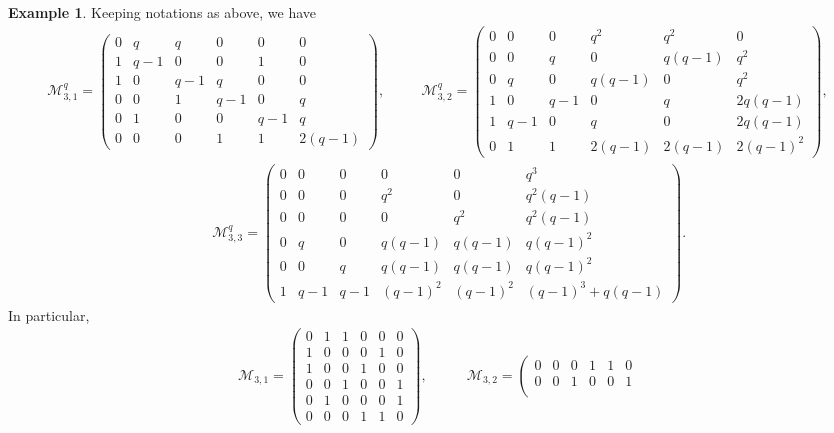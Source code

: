 \documentclass[13pt,a4paper, oneside]{amsart}       %
\numberwithin{equation}{section}
\theoremstyle{definition}
\newtheorem{example}[equation]{Example}
\theoremstyle{remark}
\begin{document}
\begin{CJK*}{GBK}{song}
\begin{example}\label{Exam:n=3-eigenvalues}
Keeping notations as above, we have
\begin{eqnarray*}
   \mathscr{M}^q_{3,1}=\left(\begin{array}{cccccc}
     0&q&q&0&0&0\\1&q\!-\!1&0&0&1&0\\
     1&0&q\!-\!1&q&0&0\\0&0&1&q\!-\!1&0&q\\
     0&1&0&0&q\!-\!1&q\\0&0&0&1&1&2(q\!-\!1)
   \end{array}
   \right),&\quad&
   \mathscr{M}^q_{3,2}=\left(\begin{array}{cccccc}
     0&0&0&q^2&q^2&0\\0&0&q&0&q(q\!-\!1)&q^2\\
     0&q&0&q(q\!-\!1)&0&q^2\\1&0&q\!-\!1&0&q&2q(q\!-\!1)\\
     1&q\!-\!1&0&q&0&2q(q\!-\!1)\\0&1&1&2(q\!-\!1)&2(q\!-\!1)&2(q\!-\!1)^2
   \end{array}
   \right),\end{eqnarray*}
\begin{eqnarray*}
  &&\mathscr{M}^q_{3,3}=\left(\begin{array}{cccccc}
     0&0&0&0&0&q^3\\0&0&0&q^2&0&q^2(q\!-\!1)\\
     0&0&0&0&q^2&q^2(q-1)\\0&q&0&q(q\!-\!1)&q(q\!-\!1)&q(q\!-\!1)^2\\
     0&0&q&q(q\!-\!1)&q(q\!-\!1)&q(q\!-\!1)^2\\
1&q\!-\!1&q\!-\!1&(q\!-\!1)^2&(q\!-\!1)^2&(q\!-\!1)^3+q(q\!-\!1)
   \end{array}
   \right).
 \end{eqnarray*}
In particular,
 \begin{eqnarray*}
  \mathscr{M}_{3,1}=\left(\begin{array}{cccccc}
     0&1&1&0&0&0\\1&0&0&0&1&0\\
     1&0&0&1&0&0\\0&0&1&0&0&1\\
     0&1&0&0&0&1\\0&0&0&1&1&0
   \end{array}
   \right), &\qquad
   \mathscr{M}_{3,2}=\left(\begin{array}{cccccc}
     0&0&0&1&1&0\\0&0&1&0&0&1\\

\end{array}
\end{eqnarray*}
\end{example}
\end{CJK*}
\end{document}
